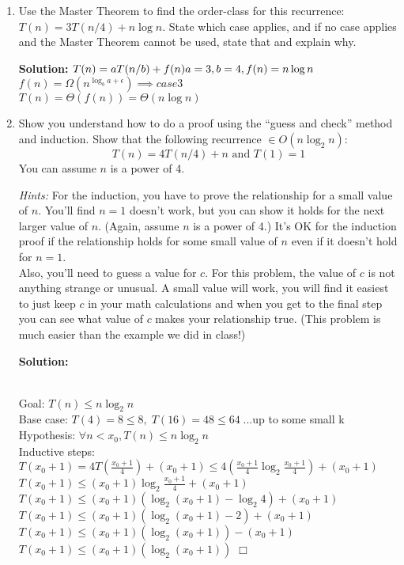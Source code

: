 \documentclass[10pt]{article}
\newenvironment{proof}{\par\noindent{\it Proof.}\hspace*{1em}}{$\Box$\bigskip}
\begin{document}
\begin{enumerate}
    	\item Use the Master Theorem to find the order-class for this recurrence: $T(n) = 3 T (n/4) + n \log n$.  State which case applies, and if no case applies and the Master Theorem cannot be used, state that and explain why.
    	
    	\textbf{Solution:}  $T(n) = aT(n/b)+f(n) \\
    	a = 3, b = 4, f(n) = n \log n $ \\
    	$f(n) = \Omega\left(n^{\log_b a + \epsilon}\right) \implies case3$ \\
    	$T(n) = \Theta (f(n)) = \Theta (n\log n)$ 
    	
    	\item Show you understand how to do a proof using the ``guess and check'' method and induction.   Show that the following recurrence $\in O(n \log_2 n)$:
    	$$T(n) = 4 T(n/4) + n \textrm{ and } T(1) = 1$$ 
    	You can assume $n$ is a power of 4.
    	
    	\emph{Hints:} For the induction, you have to prove the relationship for a small value of $n$.  You'll find $n=1$ doesn't work, but you can show it holds for the
    	next larger value of $n$.  (Again, assume $n$ is a power of 4.) It's OK for the induction proof if the relationship holds for some small value of $n$ even
    	if it doesn't hold for $n=1$.\\
    	Also, you'll need to guess a value for $c$. For this problem, the value of $c$ is not anything strange or unusual.  A small value will work, you will find it easiest to just keep $c$ in your math calculations and when you get to the final step you can see what value of $c$ makes your relationship true. 
    	(This problem is much easier than the example we did in class!) 
    	
    	\textbf{Solution:}  
    	\begin{proof} \\
    	Goal: $T(n) \le n\log_2 n$\\
    	Base case: $T(4) = 8 \le 8, \; T(16) = 48 \le 64 \;$...up to some small k\\
    	Hypothesis: $\forall n < x_0, T(n) \le n\log_2 n$ \\
    	Inductive steps: \\
    	$T(x_0+1) = 4T(\frac{x_0+1}{4}) + (x_0 + 1) \le 4\left(\frac{x_0+1}{4}\log_2 \frac{x_0+1}{4}\right)+(x_0+1)$ \\
    	$T(x_0+1) \le (x_0+1)\log_2 \frac{x_0+1}{4} + (x_0 +1)$\\
    	$T(x_0+1) \le (x_0+1)(\log_2 (x_0+1) - \log_2 4) + (x_0 +1)$\\
    	$T(x_0+1) \le (x_0+1)(\log_2 (x_0+1) - 2) + (x_0 +1)$\\
    	$T(x_0+1) \le (x_0+1)(\log_2 (x_0+1)) - (x_0 +1)$\\
    	$T(x_0+1) \le (x_0+1)(\log_2 (x_0+1))$
    	\end{proof}
      \end{enumerate}   
\end{document}
